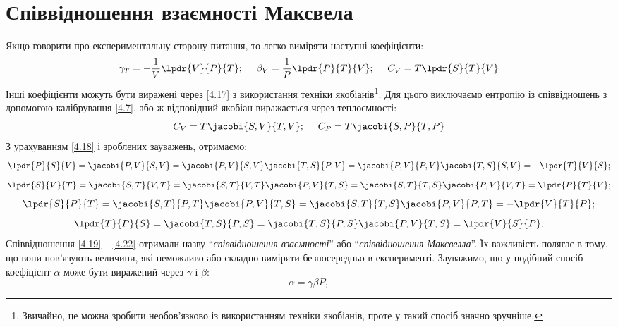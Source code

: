 \section{Співвідношення взаємності Максвела}
Якщо говорити про експериментальну сторону питання, то легко виміряти наступні коефіцієнти:
\begin{equation}\label{4.17}
	\gamma_T = -\dfrac{1}{V}\lpdr{V}{P}{T}; ~~~~ \beta_V=\dfrac{1}{P}\lpdr{P}{T}{V}; ~~~~
	C_V = T\lpdr{S}{T}{V}
\end{equation}
Інші коефіцієнти можуть бути виражені через \eqref{4.17} з використання техніки
якобіанів\footnote{Звичайно, це можна зробити необов’язково із використанням техніки якобіанів, проте
у такий спосіб значно зручніше.}. Для цього виключаємо ентропію із
співвідношень з допомогою калібрування \eqref{4.7}, або ж відповідний якобіан виражається через
теплоємності:
\begin{equation}\label{4.18}
	C_V = T\jacobi{S,V}{T,V}; ~~~~ C_P=T\jacobi{S,P}{T,P}
\end{equation}
З урахуванням \eqref{4.18} і зроблених зауважень, отримаємо:
\begin{equation}\label{4.19}
	\lpdr{P}{S}{V}=\jacobi{P,V}{S,V}=\jacobi{P,V}{S,V}\jacobi{T,S}{P,V}=\jacobi{P,V}{P,V}\jacobi{T,S}{S,V}=-\lpdr{T}{V}{S};
\end{equation}
\begin{equation}\label{4.20}
	\lpdr{S}{V}{T}=\jacobi{S,T}{V,T}=\jacobi{S,T}{V,T}\jacobi{P,V}{T,S}=\jacobi{S,T}{T,S}\jacobi{P,V}{V,T}=\lpdr{P}{T}{V};
\end{equation}
\begin{equation}\label{4.21}
	\lpdr{S}{P}{T}=\jacobi{S,T}{P,T}\jacobi{P,V}{T,S}=\jacobi{S,T}{T,S}\jacobi{P,V}{P,T}=-\lpdr{V}{T}{P};
\end{equation}
\begin{equation}\label{4.22}
	\lpdr{T}{P}{S}=\jacobi{T,S}{P,S}=\jacobi{T,S}{P,S}\jacobi{P,V}{T,S}=\lpdr{V}{S}{P}.
\end{equation}
Співвідношення \eqref{4.19} -- \eqref{4.22} отримали назву \enquote{\emph{співвідношення взаємності}}
або \enquote{\emph{співвідношення Максвелла}}. Їх важливість полягає в тому, що вони пов'язують
величини, які неможливо або складно виміряти безпосередньо в експерименті. Зауважимо, що у подібний
спосіб коефіцієнт $\alpha$ може бути виражений через $\gamma$ і $\beta$:
\begin{equation}\label{4.23}
	\alpha=\gamma\beta P,
\end{equation}
